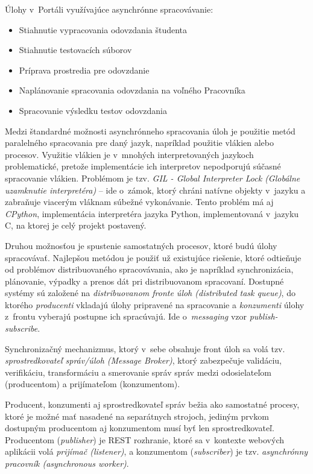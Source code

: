 \documentclass[
  digital, %
  oneside, %
  table,   %
  lof,     %
  lot,   %
]{fithesis3}
\begin{document}
Úlohy v~Portáli využívajúce asynchrónne spracovávanie:

\begin{itemize}
    \item Stiahnutie vypracovania odovzdania študenta
    \item Stiahnutie testovacích súborov
    \item Príprava prostredia pre odovzdanie
    \item Naplánovanie spracovania odovzdania na voľného Pracovníka
    \item Spracovanie výsledku testov odovzdania
\end{itemize}

Medzi štandardné možnosti asynchrónneho spracovania úloh je použitie metód paralelného spracovania pre daný jazyk, napríklad použitie vlákien alebo procesov. Využitie vlákien je v~mnohých interpretovaných jazykoch problematické, pretože implementácie ich interpretov nepodporujú súčasné spracovanie vlákien. Problémom je tzv. \emph{GIL - Global Interpreter Lock (Globálne uzamknutie interpretéra)} -- ide o~zámok, ktorý chráni natívne objekty v~jazyku a zabraňuje viacerým vláknam súbežné vykonávanie. Tento problém má aj \emph{CPython}, implementácia interpretéra jazyka Python, implementovaná v~jazyku C, na ktorej je celý projekt postavený\cite{cpython-gil}.

Druhou možnosťou je spustenie samostatných procesov, ktoré budú úlohy spracovávať. Najlepšou metódou je použiť už existujúce riešenie, ktoré odtieňuje od problémov distribuovaného spracovávania, ako je napríklad synchronizácia, plánovanie, výpadky a prenos dát pri distribuovanom spracovaní. Dostupné systémy sú založené na \emph{distribuovanom fronte úloh (distributed task queue)}, do ktorého \emph{producenti} vkladajú úlohy pripravené na spracovanie a \emph{konzumenti} úlohy z~frontu vyberajú postupne ich spracúvajú. Ide o~\emph{messaging} vzor \emph{publish-subscribe}\cite{ethomas-soa}.

Synchronizačný mechanizmus, ktorý v~sebe obsahuje front úloh sa volá tzv. \emph{sprostredkovateľ správ/úloh (Message Broker)}, ktorý zabezpečuje validáciu, verifikáciu, transformáciu a smerovanie správ správ medzi odosielateľom (producentom) a prijímateľom (konzumentom)\cite{mom}.

Producent, konzumenti aj sprostredkovateľ správ bežia ako samostatné procesy, ktoré je možné mať nasadené na separátnych strojoch, jediným prvkom dostupným producentom aj konzumentom musí byť len sprostredkovateľ. Producentom (\emph{publisher}) je REST rozhranie, ktoré sa v~kontexte webových aplikácii volá \emph{prijímač (listener)}, a konzumentom (\emph{subscriber}) je tzv. \emph{asynchrónny pracovník (asynchronous worker)}.
\end{document}

